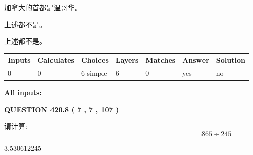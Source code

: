 \documentclass{ctexart}
\begin{document}
 
加拿大的首都是温哥华。
 
 
 上述都不是。
 
 
\noindent{}
 
 
 上述都不是。
 
 
\noindent{}
 
 
   
   
   
   
\noindent\begin{tabular}{|l|l|l|l|l|l|l|}
 \hline
Inputs & Calculates & Choices & Layers & Matches & Answer & Solution \\ \hline
 0  & 
 0  & 
 6
  simple  
  & 
 6  & 
 0  & 
  yes & 
  no 
  \\ \hline
 \end{tabular}
   
   
   
   
\noindent{}
   
   
   
   
\noindent\vspace{0.1in}\hspace{-0.08in} {\textbf{\Large{All inputs: }}}
   
   
  
\vspace{0.2in}
  
{\textbf{\Large{QUESTION
420.8 
 ( 7 , 7 , 107 )
}}}
  
  
 
请计算:
\begin{equation}
865  \div    %
245 = \nonumber
\end{equation}
 
 
 
\noindent{}
 
 

3.530612245
 
 
\noindent{}
 
 

 
 
 
\noindent{}
 
\end{document}
